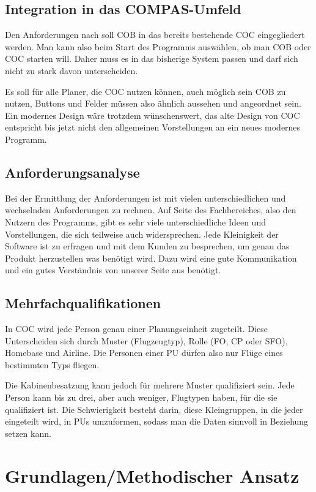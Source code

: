\documentclass [12pt, a4paper, oneside, titlepage, ngerman]{article}
\begin{document}
\subsection{Integration in das COMPAS-Umfeld}
Den Anforderungen nach soll COB in das bereits bestehende COC eingegliedert werden. Man kann also beim Start des Programms auswählen, ob man COB oder COC starten will. Daher muss es in das bisherige System passen und darf sich nicht zu stark davon unterscheiden. 

\noindent Es soll für alle Planer, die COC nutzen können, auch möglich sein COB zu nutzen, Buttons und Felder müssen also ähnlich aussehen und angeordnet sein. Ein modernes Design wäre trotzdem wünschenswert, das alte Design von COC entspricht bis jetzt nicht den allgemeinen Vorstellungen an ein neues modernes Programm.

\subsection{Anforderungsanalyse}
Bei der Ermittlung der Anforderungen ist mit vielen unterschiedlichen und wechselnden Anforderungen zu rechnen. Auf Seite des Fachbereiches, also den Nutzern des Programms, gibt es sehr viele unterschiedliche Ideen und Vorstellungen, die sich teilweise auch widersprechen. Jede Kleinigkeit der Software ist zu erfragen und mit dem Kunden zu besprechen, um genau das Produkt herzustellen was benötigt wird. Dazu wird eine gute Kommunikation und ein gutes Verständnis von unserer Seite aus benötigt.

\subsection{Mehrfachqualifikationen}
In COC wird jede Person genau einer Planungseinheit zugeteilt. Diese Unterscheiden sich durch Muster (Flugzeugtyp), Rolle (FO, CP oder SFO), Homebase und Airline. Die Personen einer PU dürfen also nur Flüge eines bestimmten Typs fliegen.

\noindent Die Kabinenbesatzung kann jedoch für mehrere Muster qualifiziert sein. Jede Person kann bis zu drei, aber auch weniger, Flugtypen haben, für die sie qualifiziert ist. Die Schwierigkeit besteht darin, diese Kleingruppen, in die jeder eingeteilt wird, in PUs umzuformen, sodass man die Daten sinnvoll in Beziehung setzen kann.

\newpage

\section {Grundlagen/Methodischer Ansatz}
\end{document}
